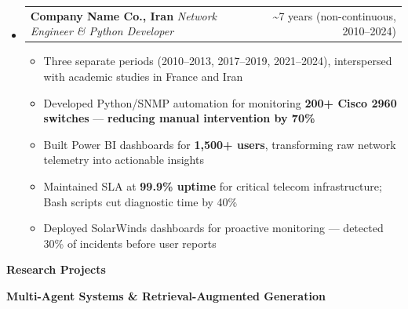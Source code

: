 \documentclass[11pt,a4paper]{article}
\makeatletter
\newcommand{\itemspace}{\vspace{0.4em}}
\newcommand{\sectionspace}{\itemspace}
\newcommand{\subspace}{\vspace{0.5em}}
\newcommand{\cvsection}[1]{
    \sectionspace
    \noindent\textcolor{primary}{\Large \textbf{#1}} \textcolor{primary}{\hrulefill}
    \par\vspace{0.4em}
}
\newcommand{\cvsubsection}[1]{
    \subspace
    \noindent\textcolor{primary}{\large \textbf{#1}}
    \par\vspace{0.3em}
}
\newcommand{\headerrow}[2]{
    \begin{tabular*}{\linewidth}{l@{\extracolsep{\fill}}r}
    #1 & \textcolor{primary}{#2} \\
    \end{tabular*}
}
\makeatother
\begin{document}
\begin{itemize}[leftmargin=1em, label={}]
    \subspace
    \item
    \headerrow{\textbf{Company Name Co., Iran} \quad \emph{Network Engineer \& Python Developer}}{\textasciitilde7 years (non-continuous, 2010--2024)}
    \begin{itemize}[leftmargin=1.5em, label=$\bullet$, nosep]
        \item Three separate periods (2010--2013, 2017--2019, 2021--2024), interspersed with academic studies in France and Iran
        \item Developed Python/SNMP automation for monitoring \textbf{200+ Cisco 2960 switches} — \textbf{reducing manual intervention by 70\%}
        \item Built Power BI dashboards for \textbf{1,500+ users}, transforming raw network telemetry into actionable insights
        \item Maintained SLA at \textbf{99.9\% uptime} for critical telecom infrastructure; Bash scripts cut diagnostic time by 40\%
        \item Deployed SolarWinds dashboards for proactive monitoring — detected 30\% of incidents before user reports
    \end{itemize}

\end{itemize}

\cvsection{Research Projects}

\cvsubsection{Multi-Agent Systems \& Retrieval-Augmented Generation}
\end{document}
